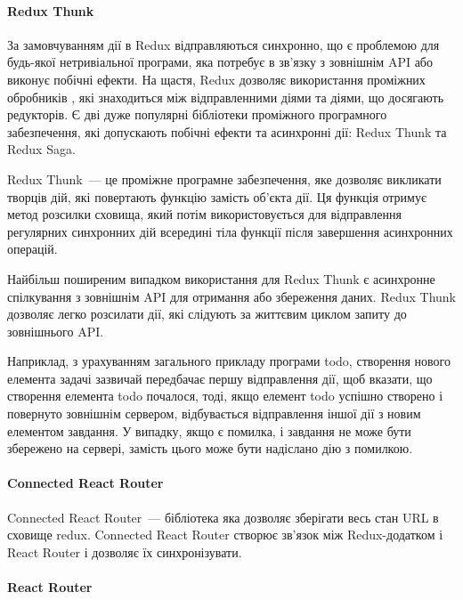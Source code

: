 \paragraph{Redux Thunk}

За замовчуванням дії в Redux відправляються синхронно, що є проблемою для будь-якої нетривіальної програми, яка потребує в зв'язку з зовнішнім API або виконує побічні ефекти. На щастя, Redux дозволяє використання проміжних обробників , які знаходиться між відправленними діями та діями, що досягають редукторів. Є дві дуже популярні бібліотеки проміжного програмного забезпечення, які допускають побічні ефекти та асинхронні дії: Redux Thunk та Redux Saga.

Redux Thunk~--- це проміжне програмне забезпечення, яке дозволяє викликати творців дій, які повертають функцію замість об'єкта дії. Ця функція отримує метод розсилки сховища, який потім використовується для відправлення регулярних синхронних дій всередині тіла функції після завершення асинхронних операцій.

Найбільш поширеним випадком використання для Redux Thunk є асинхронне спілкування з зовнішнім API для отримання або збереження даних. Redux Thunk дозволяє легко розсилати дії, які слідують за життєвим циклом запиту до зовнішнього API.

Наприклад, з урахуванням загального прикладу програми todo, створення нового елемента задачі зазвичай передбачає першу відправлення дії, щоб вказати, що створення елемента todo почалося, тоді, якщо елемент todo успішно створено і повернуто зовнішнім сервером, відбувається відправлення іншої дії з новим елементом завдання. У випадку, якщо є помилка, і завдання не може бути збережено на сервері, замість цього може бути надіслано дію з помилкою.



\paragraph{Connected React Router}

Connected React Router~--- бібліотека яка дозволяє зберігати весь стан  URL в сховище redux. Connected React Router створює зв'язок між  Redux-додатком і React Router і дозволяє їх синхронізувати.

\paragraph{React Router}

